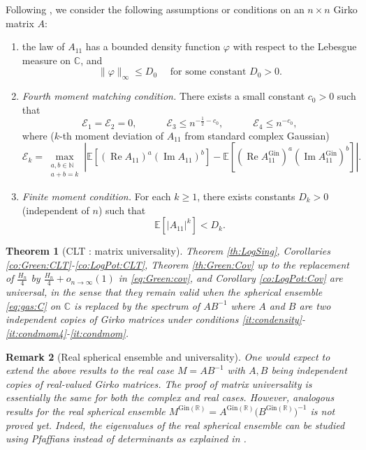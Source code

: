 \documentclass[10pt,reqno]{amsart}
\numberwithin{equation}{section}
\numberwithin{figure}{section}
\theoremstyle{plain}
\newtheorem{theorem}{Theorem}[section]
\newtheorem{remark}[theorem]{Remark}
\newcommand{\R}{{\mathbb{R}}}
\newcommand{\N}{{\mathbb{N}}}
\newcommand{\<}{\langle}
\renewcommand{\>}{\rangle}
\newcommand{\AG}{A^{\mathrm{Gin}}}
\renewcommand{\Re}{\operatorname{Re}}
\renewcommand{\Im}{\operatorname{Im}}
\begin{document}
Following \cite{chafai-garcia-zelada-xu}, we consider the following assumptions or conditions on an $n\times n$ Girko matrix $A$: 
\begin{enumerate}[label=(Cond\arabic*)]
\item\label{it:condensity} the law of $A_{11}$ has a bounded density function $\varphi$ with respect to the Lebesgue measure on $\mathbb{C}$, and
\begin{equation*}
\|\varphi\|_\infty\leq D_0\quad\text{ for some constant $D_0>0$.}
\end{equation*}
\item\label{it:condmom4} \emph{Fourth moment matching condition.}
There exists a small constant $c_0>0$ such that
\begin{equation*}
\mathcal{E}_1=\mathcal{E}_2=0, \quad \qquad \mathcal{E}_3 \leq n^{-\frac{1}{2}-c_0}, \quad\qquad \mathcal{E}_4 \leq  n^{-c_0},
\end{equation*}
where ($k$-th moment deviation of $A_{11}$ from standard complex Gaussian)
\begin{equation*}
\mathcal{E}_k=\max_{\substack{a,b\in\N\\a+b=k}} \left|\mathbb{E}[(\Re A_{11})^a(\Im A_{11})^b]-\mathbb{E}[(\Re \AG_{11})^a(\Im \AG_{11})^b]\right|.
\end{equation*}
\item\label{it:condmom} \emph{Finite moment condition.} 
For each $k\geq 1$, there exists constants $D_k>0$ (independent of $n$) such that
\begin{equation*}
\mathbb{E}[|A_{11}|^k] < D_k.
\end{equation*}

\end{enumerate}

\begin{theorem}[CLT : matrix universality]\label{th:logpot:univ}
 Theorem \ref{th:LogSing}, Corollaries \ref{co:Green:CLT}-\ref{co:LogPot:CLT},
 Theorem \ref{th:Green:Cov} up to the replacement of $\frac{H_n}{4}$ by $\frac{H_n}{4}+o_{n\to\infty}(1)$ in \eqref{eq:Green:cov}, and Corollary \ref{co:LogPot:Cov}
  are universal, in the sense that they remain valid when the spherical ensemble \eqref{eq:gas:C} on $\mathbb{C}$  is replaced by the spectrum of $AB^{-1}$ where $A$ and $B$ are two independent copies of Girko matrices under conditions \ref{it:condensity}-\ref{it:condmom4}-\ref{it:condmom}. 
\end{theorem}

\begin{remark}[Real spherical ensemble and universality]
One would expect to extend the above results to the real case $M=AB^{-1}$ with $A,B$ being independent copies of real-valued Girko matrices. The proof of matrix universality is essentially the same for both the complex and real cases. However, analogous results for the real spherical ensemble $M^{\mathrm{Gin}(\R)}=A^{\mathrm{Gin}(\R)} \big(B^{\mathrm{Gin}(\R)}\big)^{-1}$ is not proved yet. Indeed, the eigenvalues of the real spherical ensemble can be studied using Pfaffians instead
 of determinants as explained in
 \cite{zbMATH06125015}.   
 \end{remark}
\end{document}
